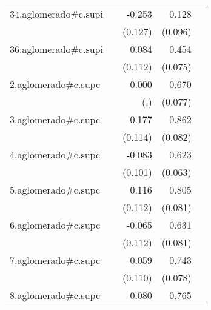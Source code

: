 {\begin{longtable}{l*{4}{D{.}{.}{-1}}}
\addlinespace
34.aglomerado#c.supi&                     &      -0.253\sym{*}  &       0.128         &                     \\
            &                     &     (0.127)         &     (0.096)         &                     \\
\addlinespace
36.aglomerado#c.supi&                     &       0.084         &       0.454\sym{***}&                     \\
            &                     &     (0.112)         &     (0.075)         &                     \\
\addlinespace
2.aglomerado#c.supc&                     &       0.000         &       0.670\sym{***}&                     \\
            &                     &         (.)         &     (0.077)         &                     \\
\addlinespace
3.aglomerado#c.supc&                     &       0.177         &       0.862\sym{***}&                     \\
            &                     &     (0.114)         &     (0.082)         &                     \\
\addlinespace
4.aglomerado#c.supc&                     &      -0.083         &       0.623\sym{***}&                     \\
            &                     &     (0.101)         &     (0.063)         &                     \\
\addlinespace
5.aglomerado#c.supc&                     &       0.116         &       0.805\sym{***}&                     \\
            &                     &     (0.112)         &     (0.081)         &                     \\
\addlinespace
6.aglomerado#c.supc&                     &      -0.065         &       0.631\sym{***}&                     \\
            &                     &     (0.112)         &     (0.081)         &                     \\
\addlinespace
7.aglomerado#c.supc&                     &       0.059         &       0.743\sym{***}&                     \\
            &                     &     (0.110)         &     (0.078)         &                     \\
\addlinespace
8.aglomerado#c.supc&                     &       0.080         &       0.765\sym{***}&                     \\

\end{longtable}}
